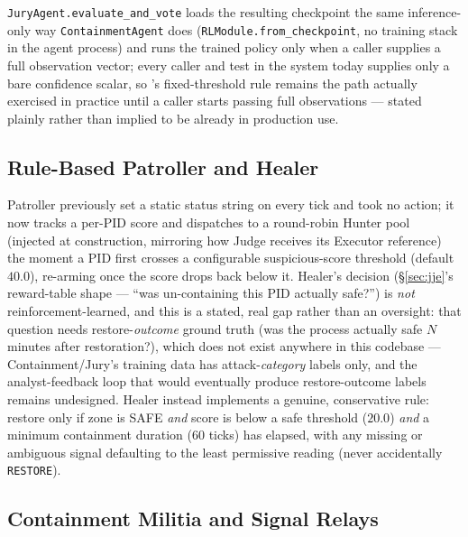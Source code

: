 \documentclass{article}
\begin{document}
\texttt{JuryAgent.evaluate\_and\_vote} loads the resulting checkpoint
the same inference-only way \texttt{ContainmentAgent} does
(\texttt{RLModule.from\_checkpoint}, no training stack in the agent
process) and runs the trained policy only when a caller supplies a
full observation vector; every caller and test in the system today
supplies only a bare confidence scalar, so 's
fixed-threshold rule remains the path actually exercised in practice
until a caller starts passing full observations --- stated plainly
rather than implied to be already in production use.

\subsection{Rule-Based Patroller and Healer}
\label{sec:patroller-healer}

Patroller previously set a static status string on every tick and took
no action; it now tracks a per-PID score and dispatches to a
round-robin Hunter pool (injected at construction, mirroring how Judge
receives its Executor reference) the moment a PID first crosses a
configurable suspicious-score threshold (default $40.0$), re-arming
once the score drops back below it. Healer's decision
(\S\ref{sec:jje}'s reward-table shape --- ``was un-containing this PID
actually safe?'') is \emph{not} reinforcement-learned, and this is a
stated, real gap rather than an oversight: that question needs
restore-\emph{outcome} ground truth (was the process actually safe $N$
minutes after restoration?), which does not exist anywhere in this
codebase --- Containment/Jury's training data has attack-\emph{category}
labels only, and the analyst-feedback loop that would eventually
produce restore-outcome labels remains undesigned. Healer instead
implements a genuine, conservative rule: restore only if zone is SAFE
\emph{and} score is below a safe threshold ($20.0$) \emph{and} a
minimum containment duration ($60$ ticks) has elapsed, with any
missing or ambiguous signal defaulting to the least permissive reading
(never accidentally \texttt{RESTORE}).

\subsection{Containment Militia and Signal Relays}
\label{sec:militia}
\end{document}
